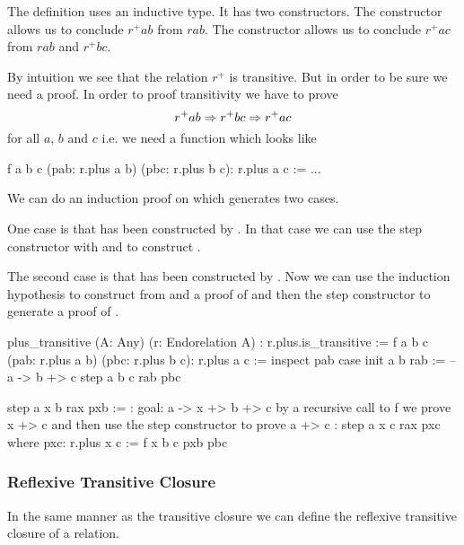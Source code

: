 The definition uses an inductive type. It has two constructors. The
 constructor allows us to conclude $r^+ a b$ from $r a b$.  The
 constructor allows us to conclude $r^+ a c$ from $r a b$ and $r^+
b c$.

By intuition we see that the relation $r^+$ is transitive. But in
order to be sure we need a proof. In order to proof transitivity we have to
prove
%
$$
 r^+ a b \Rightarrow r^+ b c \Rightarrow r^+ a c
$$
%
for all $a$, $b$ and $c$
i.e. we need a function which looks like
%
\begin{alba}
  f a b c (pab: r.plus a b) (pbc: r.plus b c): r.plus a c :=
    ...
\end{alba}
%
We can do an induction proof on  which generates two
cases.

One case is that  has been constructed
by . In that case we can use the step constructor with
 and  to construct .

The second case is that   has been constructed by . Now we can use the induction
hypothesis to construct from  and  a proof of  and then the step constructor to generate a proof of .


\begin{alba}
    plus_transitive
        (A: Any) (r: Endorelation A)
        : r.plus.is_transitive
    :=
        f a b c (pab: r.plus a b) (pbc: r.plus b c): r.plus a c :=
            inspect
                pab
            case
                init a b rab :=
                    -- a -> b +> c
                    step a b c rab pbc

                step a x b rax pxb :=
                    {: goal: a -> x +> b +> c
                       by a recursive call to f we prove x +> c
                       and then use the step constructor to prove a +> c :}
                    step a x c rax pxc
                    where
                        pxc: r.plus x c := f x b c pxb pbc
\end{alba}



\subsubsection{Reflexive Transitive Closure}

In the same manner as the transitive closure we can define the reflexive
transitive closure of a relation.

